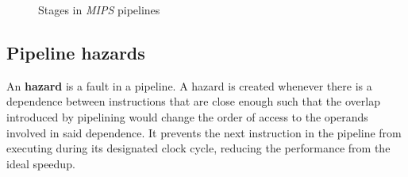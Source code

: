 \documentclass[english]{article}
\begin{document}
\begin{figure}[htbp]
  \bigskip
  \centering
  \caption{Stages in \textit{MIPS} pipelines}
  \label{fig:mips-pipeline-stages}
  \bigskip
\end{figure}

\subsection{Pipeline hazards}
\label{sec:pipeline-hazards}

An \textbf{hazard} is a fault in a pipeline.
A hazard is created whenever there is a dependence between instructions that are close enough such that the overlap introduced by pipelining would change the order of access to the operands involved in said dependence.
It prevents the next instruction in the pipeline from executing during its designated clock cycle, reducing the performance from the ideal speedup.
\end{document}
